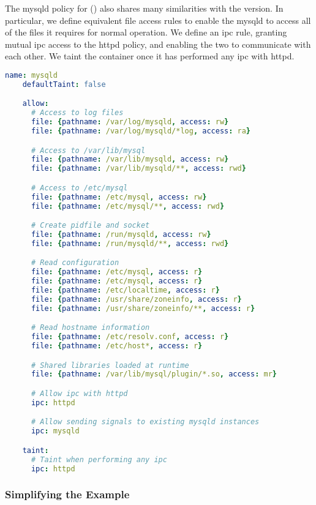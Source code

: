 The mysqld policy for \bpfcontain{} () also shares many
similarities with the \bpfbox{} version.  In particular, we define equivalent file access
rules to enable the mysqld to access all of the files it requires for normal operation. We
define an \gls{ipc} rule, granting mutual \gls{ipc} access to the httpd policy, and
enabling the two to communicate with each other. We taint the container once it has
performed any \gls{ipc} with httpd.

\begin{lstlisting}[language=yaml, gobble=4, float=false, caption={[A \bpfcontain{} policy for MySQL]
  A \bpfcontain{} policy for MySQL.
  %\todo{Describe this}
}, label={lst:bpfcontain-mysql}]
    name: mysqld
    defaultTaint: false

    allow:
      # Access to log files
      file: {pathname: /var/log/mysqld, access: rw}
      file: {pathname: /var/log/mysqld/*log, access: ra}

      # Access to /var/lib/mysql
      file: {pathname: /var/lib/mysqld, access: rw}
      file: {pathname: /var/lib/mysqld/**, access: rwd}

      # Access to /etc/mysql
      file: {pathname: /etc/mysql, access: rw}
      file: {pathname: /etc/mysql/**, access: rwd}

      # Create pidfile and socket
      file: {pathname: /run/mysqld, access: rw}
      file: {pathname: /run/mysqld/**, access: rwd}

      # Read configuration
      file: {pathname: /etc/mysql, access: r}
      file: {pathname: /etc/mysql, access: r}
      file: {pathname: /etc/localtime, access: r}
      file: {pathname: /usr/share/zoneinfo, access: r}
      file: {pathname: /usr/share/zoneinfo/**, access: r}

      # Read hostname information
      file: {pathname: /etc/resolv.conf, access: r}
      file: {pathname: /etc/host*, access: r}

      # Shared libraries loaded at runtime
      file: {pathname: /var/lib/mysql/plugin/*.so, access: mr}

      # Allow ipc with httpd
      ipc: httpd

      # Allow sending signals to existing mysqld instances
      ipc: mysqld

    taint:
      # Taint when performing any ipc
      ipc: httpd
\end{lstlisting}

\subsubsection{Simplifying the \bpfcontain{} Example}

